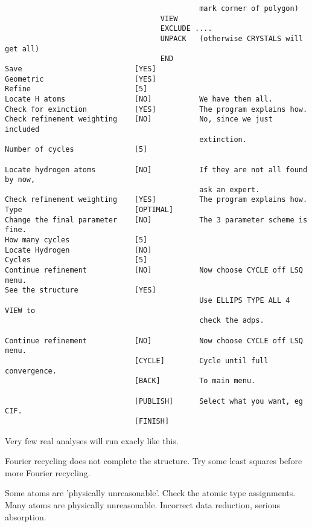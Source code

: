 \documentclass[10pt,a4paper]{report}
\begin{document}
\begin{verbatim}
                                             mark corner of polygon)
                                    VIEW
                                    EXCLUDE ....
                                    UNPACK   (otherwise CRYSTALS will get all)
                                    END
Save                          [YES]
Geometric                     [YES]
Refine                        [5]
Locate H atoms                [NO]           We have them all.
Check for exinction           [YES]          The program explains how.
Check refinement weighting    [NO]           No, since we just included
                                             extinction.
Number of cycles              [5]

Locate hydrogen atoms         [NO]           If they are not all found by now,
                                             ask an expert.
Check refinement weighting    [YES]          The program explains how.
Type                          [OPTIMAL]
Change the final parameter    [NO]           The 3 parameter scheme is fine.
How many cycles               [5]
Locate Hydrogen               [NO]
Cycles                        [5]
Continue refinement           [NO]           Now choose CYCLE off LSQ menu.
See the structure             [YES]
                                             Use ELLIPS TYPE ALL 4 VIEW to
                                             check the adps.

Continue refinement           [NO]           Now choose CYCLE off LSQ menu.
                              [CYCLE]        Cycle until full convergence.
                              [BACK]         To main menu.

                              [PUBLISH]      Select what you want, eg CIF.
                              [FINISH]
\end{verbatim}\normalsize





Very few real analyses will run exacly like this.





\bigskip{}




Fourier recycling does not complete the structure. Try some least squares
before more Fourier recycling.





Some atoms are 'physically unreasonable'. Check the atomic type assignments.
Many atoms are physically unreasonable. Incorrect data reduction, serious
absorption.
\end{document}
